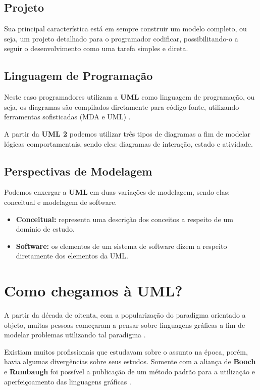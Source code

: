 \documentclass[a4paper, 12pt]{article}
\begin{document}
	\subsection{Projeto}
	
		Sua principal característica está em sempre construir um modelo completo, ou seja, um projeto detalhado para o programador codificar, possibilitando-o a seguir o desenvolvimento como uma tarefa simples e direta. 
	
	
	\subsection{Linguagem de Programação}
	
		Neste caso programadores utilizam a \textbf{UML} como linguagem de programação, ou seja, os diagramas são compilados diretamente para código-fonte, utilizando ferramentas sofisticadas (MDA e UML) \cite{umlEssencial}.
		
		 A partir da \textbf{UML 2} podemos utilizar três tipos de diagramas a fim de modelar lógicas comportamentais, sendo eles: diagramas de interação, estado e atividade.
	
	\subsection{Perspectivas de Modelagem}
	
		Podemos enxergar a \textbf{UML} em duas variações de modelagem, sendo elas: conceitual e modelagem de software.
		
		\begin{itemize}
			\item \textbf{Conceitual:} representa uma descrição dos conceitos a respeito de um domínio de estudo.
			
			\item \textbf{Software:} os elementos de um sistema de software dizem a respeito diretamente dos elementos da UML. 
		\end{itemize}
	
	
	\section{Como chegamos à UML?}
	
		A partir da década de oitenta, com a popularização do paradigma orientado a objeto, muitas pessoas começaram a pensar sobre linguagens gráficas a fim de modelar problemas utilizando tal paradigma \cite{umlEssencial}.
		
		Existiam muitos profissionais que estudavam sobre o assunto na época, porém, havia algumas divergências sobre seus estudos. Somente com a aliança de \textbf{Booch} e \textbf{Rumbaugh} foi possível a publicação de um método padrão para a utilização e aperfeiçoamento das linguagens gráficas \cite{umlEssencial}.
		
\end{document}
